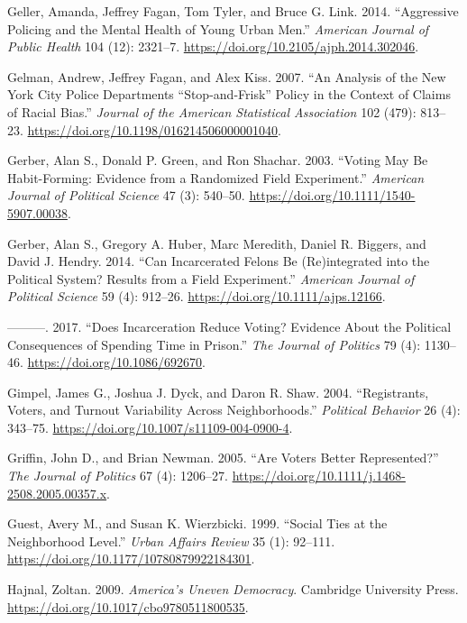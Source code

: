 \documentclass[12pt,]{article}
\begin{document}
\leavevmode\hypertarget{ref-Geller2014}{}%
Geller, Amanda, Jeffrey Fagan, Tom Tyler, and Bruce G. Link. 2014. ``Aggressive Policing and the Mental Health of Young Urban Men.'' \emph{American Journal of Public Health} 104 (12): 2321--7. \url{https://doi.org/10.2105/ajph.2014.302046}.

\leavevmode\hypertarget{ref-Gelman2007}{}%
Gelman, Andrew, Jeffrey Fagan, and Alex Kiss. 2007. ``An Analysis of the New York City Police Departments ``Stop-and-Frisk'' Policy in the Context of Claims of Racial Bias.'' \emph{Journal of the American Statistical Association} 102 (479): 813--23. \url{https://doi.org/10.1198/016214506000001040}.

\leavevmode\hypertarget{ref-Gerber2003}{}%
Gerber, Alan S., Donald P. Green, and Ron Shachar. 2003. ``Voting May Be Habit-Forming: Evidence from a Randomized Field Experiment.'' \emph{American Journal of Political Science} 47 (3): 540--50. \url{https://doi.org/10.1111/1540-5907.00038}.

\leavevmode\hypertarget{ref-Gerber2014}{}%
Gerber, Alan S., Gregory A. Huber, Marc Meredith, Daniel R. Biggers, and David J. Hendry. 2014. ``Can Incarcerated Felons Be (Re)integrated into the Political System? Results from a Field Experiment.'' \emph{American Journal of Political Science} 59 (4): 912--26. \url{https://doi.org/10.1111/ajps.12166}.

\leavevmode\hypertarget{ref-Gerber2017}{}%
---------. 2017. ``Does Incarceration Reduce Voting? Evidence About the Political Consequences of Spending Time in Prison.'' \emph{The Journal of Politics} 79 (4): 1130--46. \url{https://doi.org/10.1086/692670}.

\leavevmode\hypertarget{ref-Gimpel2004}{}%
Gimpel, James G., Joshua J. Dyck, and Daron R. Shaw. 2004. ``Registrants, Voters, and Turnout Variability Across Neighborhoods.'' \emph{Political Behavior} 26 (4): 343--75. \url{https://doi.org/10.1007/s11109-004-0900-4}.

\leavevmode\hypertarget{ref-Griffin2005}{}%
Griffin, John D., and Brian Newman. 2005. ``Are Voters Better Represented?'' \emph{The Journal of Politics} 67 (4): 1206--27. \url{https://doi.org/10.1111/j.1468-2508.2005.00357.x}.

\leavevmode\hypertarget{ref-Guest1999}{}%
Guest, Avery M., and Susan K. Wierzbicki. 1999. ``Social Ties at the Neighborhood Level.'' \emph{Urban Affairs Review} 35 (1): 92--111. \url{https://doi.org/10.1177/10780879922184301}.

\leavevmode\hypertarget{ref-Hajnal2009}{}%
Hajnal, Zoltan. 2009. \emph{America's Uneven Democracy}. Cambridge University Press. \url{https://doi.org/10.1017/cbo9780511800535}.
\end{document}
